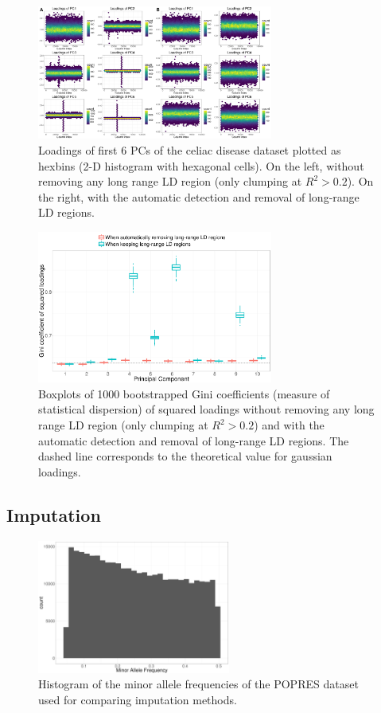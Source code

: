 \documentclass{bioinfo}
\begin{document}
\begin{figure}[!tpb]
\centerline{\includegraphics[width=220pt]{loadings}}
\caption{Loadings of first 6 PCs of the celiac disease dataset plotted as hexbins (2-D histogram with hexagonal cells). On the left, without removing any long range LD region (only clumping at $R^2 > 0.2$). On the right, with the automatic detection and removal of long-range LD regions.}\label{fig:loadings}
\end{figure}

\begin{figure}[!tpb]
\centerline{\includegraphics[width=220pt]{gini}}
\caption{Boxplots of 1000 bootstrapped Gini coefficients (measure of statistical dispersion) of squared loadings without removing any long range LD region (only clumping at $R^2 > 0.2$) and with the automatic detection and removal of long-range LD regions. The dashed line corresponds to the theoretical value for gaussian loadings.}\label{fig:gini}
\end{figure}

\subsection{Imputation}

\begin{figure}[!tpb]
\centerline{\includegraphics[width=180pt]{hist-maf}}
\caption{Histogram of the minor allele frequencies of the POPRES dataset used for comparing imputation methods.}\label{fig:maf}
\end{figure}
\end{document}
